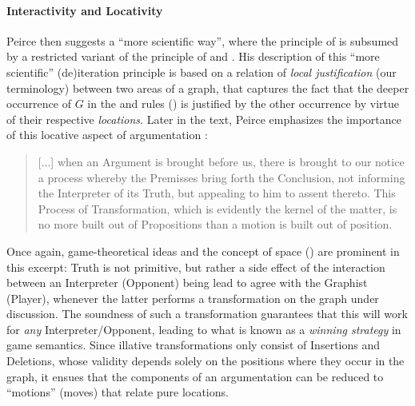 \paragraph{Interactivity and Locativity}

Peirce then suggests a ``more scientific way'', where the principle of
 is subsumed by a restricted variant of the principle of
 and . His description of this ``more
scientific'' (de)iteration principle is based on a relation of \emph{local
justification} (our terminology) between two areas of a graph, that captures the
fact that the deeper occurrence of $G$ in the  and  rules
() is justified by the other occurrence by virtue of their
respective \emph{locations}. Later in the text, Peirce emphasizes the importance
of this locative aspect of argumentation
\cite[pp.~544-545]{peirce_prolegomena_1906}:

\begin{quote}
  [...] when an Argument is brought before us, there is brought to our notice a
process whereby the Premisses bring forth the Conclusion, not informing the
Interpreter of its Truth, but appealing to him to assent thereto. This Process
of Transformation, which is evidently the kernel of the matter, is no more built
out of Propositions than a motion is built out of position.
\end{quote}

Once again, game-theoretical ideas and the concept of space
() are prominent in this excerpt: Truth is not primitive,
but rather a side effect of the interaction between an Interpreter (Opponent)
being lead to agree with the Graphist (Player), whenever the latter performs a
transformation on the graph under discussion. The soundness of such a
transformation guarantees that this will work for \emph{any}
Interpreter/Opponent, leading to what is known as a \emph{winning strategy} in
game semantics. Since illative transformations only consist of Insertions and
Deletions, whose validity depends solely on the positions where they occur in
the graph, it ensues that the components of an argumentation can be reduced to
``motions'' (moves) that relate pure locations.

